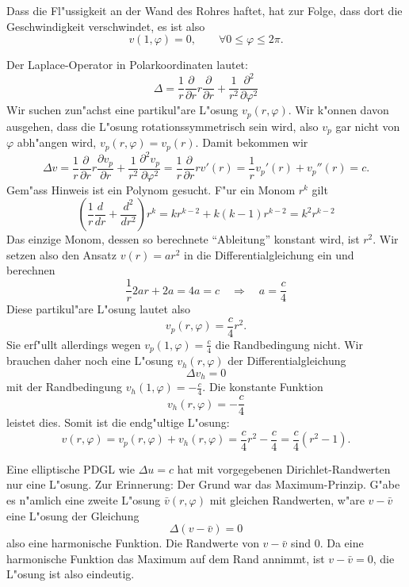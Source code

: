 \begin{loesung}
\begin{teilaufgaben}
\item Dass die Fl"ussigkeit an der Wand des Rohres haftet, hat zur
Folge, dass dort die Geschwindigkeit verschwindet, es ist also
\[
v(1,\varphi)=0,\qquad\forall 0\le \varphi\le 2\pi.
\]
\item Der Laplace-Operator in Polarkoordinaten lautet:
\[
\Delta
=
\frac1r\frac{\partial}{\partial r}r\frac{\partial}{\partial r}
+\frac1{r^2}\frac{\partial^2}{\partial\varphi^2}
\]
Wir suchen zun"achst eine partikul"are L"osung $v_p(r,\varphi)$.
Wir k"onnen davon ausgehen, dass die L"osung rotationssymmetrisch
sein wird, also $v_p$ gar nicht von $\varphi$ abh"angen wird,
$v_p(r,\varphi)=v_p(r)$. Damit bekommen wir
\[
\Delta v=
\frac1r\frac{\partial}{\partial r}r
\frac{\partial v_p}{\partial r}
+\frac1{r^2}\frac{\partial^2v_p}{\partial\varphi^2}
=
\frac1r\frac{\partial}{\partial r}rv'(r)
=
\frac1rv_p'(r)+v_p''(r)=c.
\]
Gem"ass Hinweis ist ein Polynom gesucht. F"ur ein Monom $r^k$
gilt
\[
\left(\frac1r\frac{d}{dr}+\frac{d^2}{dr^2}\right)r^k
=kr^{k-2}+k(k-1)r^{k-2}
=k^2 r^{k-2}
\]
Das einzige Monom, dessen so berechnete ``Ableitung'' konstant wird, ist
$r^2$.
Wir
setzen also den Ansatz $v(r)=ar^2$
in die Differentialgleichung ein und berechnen
\[
\frac1r2ar+2a
=
4a
=c
\quad
\Rightarrow
\quad
a=\frac{c}{4}
\]
Diese partikul"are L"osung lautet also
\[
v_p(r,\varphi)=\frac{c}{4}r^2.
\]
Sie erf"ullt allerdings wegen $v_p(1,\varphi)=\frac{c}{4}$ die
Randbedingung nicht. Wir brauchen daher noch eine
L"osung $v_h(r,\varphi)$ der Differentialgleichung
\[
\Delta v_h=0
\]
mit der Randbedingung $v_h(1,\varphi)=-\frac{c}{4}$. Die konstante
Funktion
\[
v_h(r,\varphi)=-\frac{c}{4}
\]
leistet dies. Somit ist die endg"ultige L"osung:
\[
v(r,\varphi)=v_p(r,\varphi)+v_h(r,\varphi)=\frac{c}{4}r^2 -\frac{c}{4}=
\frac{c}{4}(r^2-1).
\]
\item Eine elliptische PDGL wie $\Delta u=c$ hat mit vorgegebenen
Dirichlet-Randwerten nur eine L"osung. Zur Erinnerung: Der Grund
war das Maximum-Prinzip.
G"abe es n"amlich eine zweite L"osung $\bar v(r,\varphi)$ mit gleichen
Randwerten, w"are
$v-\bar v$ eine L"osung der Gleichung
\[
\Delta (v-\bar v)=0
\]
also eine harmonische Funktion. Die Randwerte von $v-\bar v$ sind $0$.
Da eine harmonische Funktion das Maximum auf dem Rand annimmt, ist
$v-\bar v=0$, die  L"osung ist also eindeutig.
\end{teilaufgaben}
\end{loesung}
